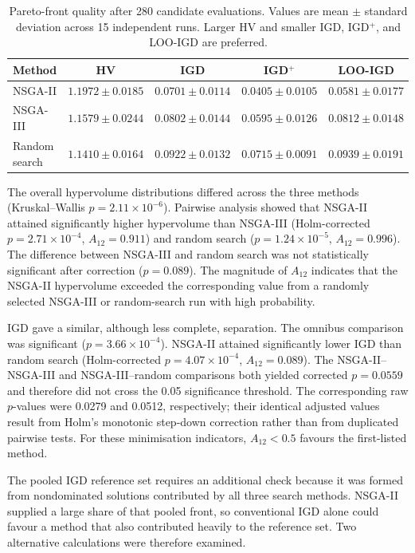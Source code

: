 \documentclass[a4paper,fleqn]{cas-sc}
\begin{document}
\begin{table}[htbp]
\centering
\caption{Pareto-front quality after 280 candidate evaluations. Values are mean $\pm$ standard deviation across 15 independent runs. Larger HV and smaller IGD, IGD$^{+}$, and LOO-IGD are preferred.}
\label{tab:final_front_quality}
\begin{tabular}{lcccc}
\toprule
\textbf{Method} &
\textbf{HV} &
\textbf{IGD} &
\textbf{IGD$^{+}$} &
\textbf{LOO-IGD} \\
\midrule
NSGA-II &
$1.1972 \pm 0.0185$ &
$0.0701 \pm 0.0114$ &
$0.0405 \pm 0.0105$ &
$0.0581 \pm 0.0177$ \\

NSGA-III &
$1.1579 \pm 0.0244$ &
$0.0802 \pm 0.0144$ &
$0.0595 \pm 0.0126$ &
$0.0812 \pm 0.0148$ \\

Random search &
$1.1410 \pm 0.0164$ &
$0.0922 \pm 0.0132$ &
$0.0715 \pm 0.0091$ &
$0.0939 \pm 0.0191$ \\
\bottomrule
\end{tabular}
\end{table}

The overall hypervolume distributions differed across the three methods (Kruskal--Wallis $p=2.11\times10^{-6}$). Pairwise analysis showed that NSGA-II attained significantly higher hypervolume than NSGA-III (Holm-corrected $p=2.71\times10^{-4}$, $A_{12}=0.911$) and random search ($p=1.24\times10^{-5}$, $A_{12}=0.996$). The difference between NSGA-III and random search was not statistically significant after correction ($p=0.089$). The magnitude of $A_{12}$ indicates that the NSGA-II hypervolume exceeded the corresponding value from a randomly selected NSGA-III or random-search run with high probability.

IGD gave a similar, although less complete, separation. The omnibus comparison was significant ($p=3.66\times10^{-4}$). NSGA-II attained significantly lower IGD than random search (Holm-corrected $p=4.07\times10^{-4}$, $A_{12}=0.089$). The NSGA-II--NSGA-III and NSGA-III--random comparisons both yielded corrected $p=0.0559$ and therefore did not cross the 0.05 significance threshold. The corresponding raw $p$-values were 0.0279 and 0.0512, respectively; their identical adjusted values result from Holm's monotonic step-down correction rather than from duplicated pairwise tests. For these minimisation indicators, $A_{12}<0.5$ favours the first-listed method.


The pooled IGD reference set requires an additional check because it was formed from nondominated solutions contributed by all three search methods. NSGA-II supplied a large share of that pooled front, so conventional IGD alone could favour a method that also contributed heavily to the reference set. Two alternative calculations were therefore examined.
\end{document}
